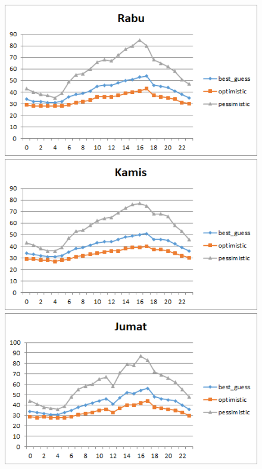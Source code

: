 \begin{figure}[H]
				\centering		
				\includegraphics[]{Gambar/rabusampel117072017normal.png}
				\includegraphics[]{Gambar/kamissampel117072017normal.png}
				\includegraphics[]{Gambar/jumatsampel117072017normal.png}
\end{figure}	
			
